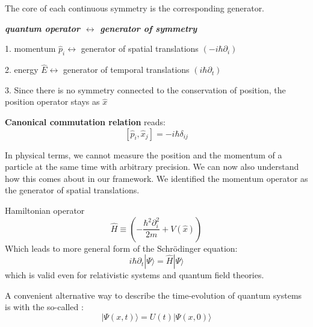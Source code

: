 \begin{qt}
    \begin{center}
        The core of each continuous symmetry is the corresponding generator.
        
        \textit{\textbf{quantum operator $\leftrightarrow$ generator of symmetry}}
    \end{center}
\end{qt}
\begin{qt}
\begin{center}
    1. momentum $\hat{p}_{i} \leftrightarrow$ generator of spatial translations $\left(-i \hbar \partial_{i}\right)$
    
    2. energy $\hat{E} \leftrightarrow$ generator of temporal translations $\left(i \hbar \partial_{t}\right)$
    
    3. Since there is no symmetry connected to the conservation of position, the position operator stays as $\hat{x}$
\end{center}
\end{qt}
\begin{qt}
\textbf{Canonical commutation relation} reads:
\begin{equation}
\left[\hat{p}_{i}, \hat{x}_{j}\right]=-i \hbar \delta_{i j}
\end{equation}
\end{qt}
In physical terms, we cannot measure the position and the momentum of a particle at the same time with arbitrary precision. We can now also understand how this comes about in our framework. We identified the momentum operator as the generator of spatial translations.
\begin{qt}
Hamiltonian operator
\begin{equation}
\hat{H} \equiv\left(-\frac{\hbar^{2} \partial_{i}^{2}}{2 m}+V(\hat{x})\right)
\end{equation}
Which leads to more general form of the Schrödinger equation:
\begin{equation}
i \hbar \partial_{t}|\Psi\rangle=\hat{H}|\Psi\rangle
\end{equation}
which is valid even for relativistic systems and quantum field theories.
\end{qt}
A convenient alternative way to describe the time-evolution of quantum systems is with the so-called \textbf{}:
\begin{equation}
|\Psi(x, t)\rangle= U(t)|\Psi(x, 0)\rangle
\end{equation}
